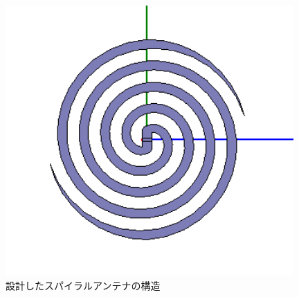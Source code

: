 \documentclass[11pt,a4paper,uplatex,draft]{ujarticle}
\begin{document}
  \begin{figure}[hbtp]
    \centering
    \includegraphics[keepaspectratio, width=110mm]{Images/spiral_antenna_configuration.png}
    \caption{設計したスパイラルアンテナの構造}
    \label{fig:spiral_antenna_configuration}
  \end{figure}
\end{document}
